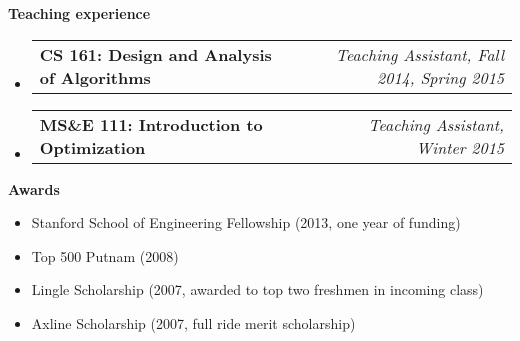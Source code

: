 \documentclass[letterpaper,10pt]{article}
\makeatletter
\newcommand{\resheading}[1]{{\large \colorbox{mygrey}{\begin{minipage}{\textwidth}{\textbf{#1 \vphantom{p\^{E}}}}\end{minipage}}}}
\newcommand{\ressubheading}[4]{
\begin{tabular*}{7.0in}{l@{\extracolsep{\fill}}r}
		\textbf{#1} & \textit{#4} \\
\end{tabular*}\vspace{-6pt}}
\makeatother
\begin{document}
\resheading{Teaching experience}
\begin{itemize}
\item
	\ressubheading{CS 161: Design and Analysis of Algorithms}{Stanford, CA}{Teaching Assistant}{Teaching Assistant, Fall 2014, Spring 2015}
\item
	\ressubheading{MS\&E 111: Introduction to Optimization}{Stanford, CA}{Teaching Assistant}{Teaching Assistant, Winter 2015}
\end{itemize}



\resheading{Awards}
\begin{itemize}
	\item Stanford School of Engineering Fellowship (2013, one year of funding)
	\item Top 500 Putnam (2008)
	\item Lingle Scholarship (2007, awarded to top two freshmen in incoming class)
	\item Axline Scholarship (2007, full ride merit scholarship)
\end{itemize}
\end{document}
